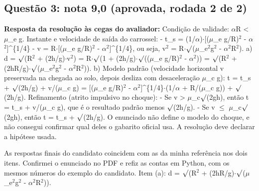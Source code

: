 \documentclass{article}%
\begin{document}
\subsection*{Questão 3: nota 9,0 (aprovada, rodada 2 de 2)}%
\textbf{Resposta da resolução às cegas do avaliador:} Condição de validade: $\alpha$R < $\mu$\_e g.\newline%
\newline%
Instante e velocidade de saída do carrossel:\newline%
{-} t\_s = (1/$\alpha$)$\cdot${[}($\mu$\_e g/R)$^2$ - $\alpha$$^2${]}\^{}\{1/4\}\newline%
{-} v = R$\cdot${[}($\mu$\_e g/R)$^2$ - $\alpha$$^2${]}\^{}\{1/4\}, ou seja, v$^2$ = R$\cdot$$\surd$($\mu$\_e$^2$g$^2$ - $\alpha$$^2$R$^2$).\newline%
\newline%
a) d = $\surd$(R$^2$ + (2h/g)$\cdot$v$^2$) = R$\cdot$$\surd$(1 + (2h/g)$\cdot$$\surd$(($\mu$\_e g/R)$^2$ - $\alpha$$^2$)) = $\surd$(R$^2$ + (2hR/g)$\cdot$$\surd$($\mu$\_e$^2$g$^2$ - $\alpha$$^2$R$^2$)).\newline%
\newline%
b) Modelo padrão (velocidade horizontal v preservada na chegada ao solo, depois desliza com desaceleração $\mu$\_c g):\newline%
t = t\_s + $\surd$(2h/g) + v/($\mu$\_c g) = {[}($\mu$\_e g/R)$^2$ - $\alpha$$^2${]}\^{}\{1/4\}$\cdot$(1/$\alpha$ + R/($\mu$\_c g)) + $\surd$(2h/g).\newline%
\newline%
Refinamento (atrito impulsivo no choque):\newline%
{-} Se v > $\mu$\_c$\surd$(2gh), então t = t\_s + v/($\mu$\_c g), que é o resultado padrão menos $\surd$(2h/g).\newline%
{-} Se v $\leq$ $\mu$\_c$\surd$(2gh), então t = t\_s + $\surd$(2h/g).\newline%
\newline%
O enunciado não define o modelo do choque, e não consegui confirmar qual deles o gabarito oficial usa. A resolução deve declarar a hipótese usada.\par %
As respostas finais do candidato coincidem com as da minha referência nos dois itens. Confirmei o enunciado no PDF e refiz as contas em Python, com os mesmos números do exemplo do candidato.\newline%
\newline%
Item (a): d = $\surd$(R$^2$ + (2hR/g)$\cdot$$\surd$($\mu$\_e$^2$g$^2$ - $\alpha$$^2$R$^2$)).\newline%
\end{document}
